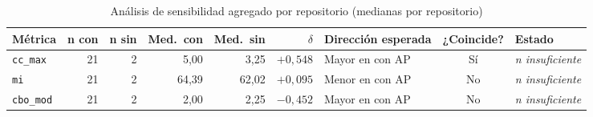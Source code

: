 \begin{table}[t]
\centering
\footnotesize
\setlength{\tabcolsep}{4pt}
\caption{Análisis de sensibilidad agregado por repositorio (medianas por repositorio)}
\label{tab:sensibilidad}
\begin{tabularx}{\textwidth}{@{}l r r r r r >{\raggedright\arraybackslash}X c l@{}}
\toprule
\textbf{Métrica} & \textbf{n con} & \textbf{n sin} & \textbf{Med.\ con} & \textbf{Med.\ sin} & \textbf{$\delta$} & \textbf{Dirección esperada} & \textbf{¿Coincide?} & \textbf{Estado} \\
\midrule
\texttt{cc\_max} & 21 & 2 & 5,00 & 3,25 & $+0{,}548$ & Mayor en con AP & Sí & \textit{n insuficiente} \\
\texttt{mi} & 21 & 2 & 64,39 & 62,02 & $+0{,}095$ & Menor en con AP & No & \textit{n insuficiente} \\
\texttt{cbo\_mod} & 21 & 2 & 2,00 & 2,25 & $-0{,}452$ & Mayor en con AP & No & \textit{n insuficiente} \\
\bottomrule
\end{tabularx}
\end{table}